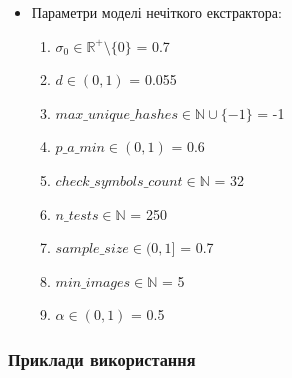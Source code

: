 \documentclass[11pt]{article}
\providecommand{\tightlist}{%
      \setlength{\itemsep}{0pt}\setlength{\parskip}{0pt}}
\begin{document}
    \begin{itemize}
\item
  Параметри моделі нечіткого екстрактора:

  \begin{enumerate}
  \def\labelenumi{\arabic{enumi}.}
  \tightlist
  \item
    \(\sigma_0 \in \mathbb{R}^+\setminus \{0\}\) = 0.7
  \item
    \(d \in (0,1)\) = 0.055
  \item
    \(max\_unique\_hashes \in \mathbb{N}\cup \{-1\}\) = -1
  \item
    \(p\_a\_min \in (0,1)\) = 0.6
  \item
    \(check\_symbols\_count \in \mathbb{N}\) = 32
  \item
    \(n\_tests \in \mathbb{N}\) = 250
  \item
    \(sample\_size \in (0,1]\) = 0.7
  \item
    \(min\_images \in \mathbb{N}\) = 5
  \item
    \(\alpha \in (0,1)\) = 0.5
  \end{enumerate}
\end{itemize}

    \hypertarget{ux43fux440ux438ux43aux43bux430ux434ux438-ux432ux438ux43aux43eux440ux438ux441ux442ux430ux43dux43dux44f}{%
\subsubsection{Приклади
використання}\label{ux43fux440ux438ux43aux43bux430ux434ux438-ux432ux438ux43aux43eux440ux438ux441ux442ux430ux43dux43dux44f}}
\end{document}

